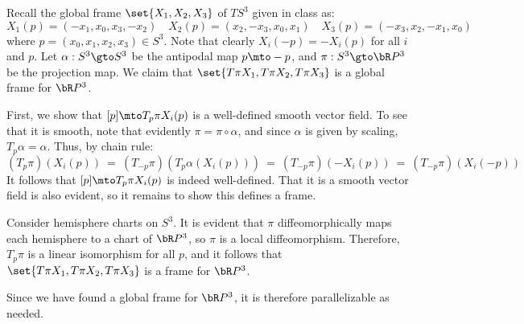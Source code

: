 \documentclass[14pt]{extarticle}
\begin{document}
\begin{soln}
	Recall the global frame $\set{X_{1},X_{2},X_{3}}$ of $TS^{3}$ given in class as:
	\begin{equation*}
		X_{1}(p) = (-x_{1},x_{0},x_{3},-x_{2}) \quad
		X_{2}(p) = (x_{2},-x_{3},x_{0},x_{1}) \quad
		X_{3}(p) = (-x_{3},x_{2},-x_{1},x_{0})
	\end{equation*}
	where $p=(x_{0},x_{1},x_{2},x_{3})\in S^{3}$.
	Note that clearly $X_{i}(-p)=-X_{i}(p)$ for all $i$ and $p$.
	Let $\alpha:S^{3}\gto S^{3}$ be the antipodal map $p\mto -p$, and
	$\pi:S^{3}\gto\bR P^{3}$ be the projection map.
	We claim that $\set{T\pi X_{1},T\pi X_{2}, T\pi X_{3}}$ is a global
	frame for $\bR P^{3}$.

	First, we show that $[p]\mto T_{p}\pi X_{i}(p)$ is a well-defined smooth vector field.
	To see that it is smooth, note that evidently $\pi=\pi\circ\alpha$, and
	since $\alpha$ is given by scaling, $T_{p}\alpha=\alpha$.
	Thus, by chain rule:
	\begin{equation*}
		(T_{p}\pi)(X_{i}(p)) \ = \ (T_{-p}\pi)(T_{p}\alpha(X_{i}(p)))
		\ = \ (T_{-p}\pi)(-X_{i}(p)) \ = \ (T_{-p}\pi)(X_{i}(-p))
	\end{equation*}
	It follows that $[p]\mto T_{p}\pi X_{i}(p)$ is indeed well-defined.
	That it is a smooth vector field is also evident, so it remains to show
	this defines a frame.

	Consider hemisphere charts on $S^{3}$.
	It is evident that $\pi$ diffeomorphically maps each hemisphere to a
	chart of $\bR P^{3}$, so $\pi$ is a local diffeomorphism.
	Therefore, $T_{p}\pi$ is a linear isomorphism for all $p$, and
	it follows that $\set{T\pi X_{1},T\pi X_{2},T\pi X_{3}}$ is a frame for
	$\bR P^{3}$.

	Since we have found a global frame for $\bR P^{3}$, it is therefore
	parallelizable as needed.
\end{soln}
\end{document}

